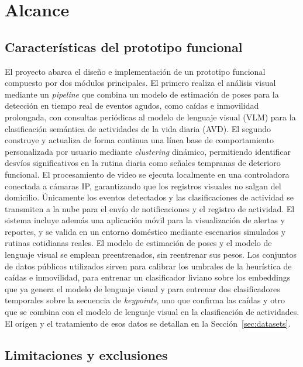 \section{Alcance}

\subsection{Características del prototipo funcional}

El proyecto abarca el diseño e implementación de un prototipo funcional compuesto por dos módulos principales.
El primero realiza el análisis visual mediante un \textit{pipeline} que combina un modelo de estimación de poses para la detección en tiempo real de eventos agudos, como caídas e inmovilidad prolongada, con consultas periódicas al modelo de lenguaje visual (VLM) para la clasificación semántica de actividades de la vida diaria (AVD).
El segundo construye y actualiza de forma continua una línea base de comportamiento personalizada por usuario mediante \textit{clustering} dinámico, permitiendo identificar desvíos significativos en la rutina diaria como señales tempranas de deterioro funcional.
El procesamiento de video se ejecuta localmente en una controladora conectada a cámaras IP, garantizando que los registros visuales no salgan del domicilio.
Únicamente los eventos detectados y las clasificaciones de actividad se transmiten a la nube para el envío de notificaciones y el registro de actividad.
El sistema incluye además una aplicación móvil para la visualización de alertas y reportes, y se valida en un entorno doméstico mediante escenarios simulados y rutinas cotidianas reales.
El modelo de estimación de poses y el modelo de lenguaje visual se emplean preentrenados, sin reentrenar sus pesos.
Los conjuntos de datos públicos utilizados sirven para calibrar los umbrales de la heurística de caídas e inmovilidad, para entrenar un clasificador liviano sobre los embeddings que ya genera el modelo de lenguaje visual y para entrenar dos clasificadores temporales sobre la secuencia de \textit{keypoints}, uno que confirma las caídas y otro que se combina con el modelo de lenguaje visual en la clasificación de actividades.
El origen y el tratamiento de esos datos se detallan en la Sección~\ref{sec:datasets}.

\subsection{Limitaciones y exclusiones}
\label{sec:limitaciones-exclusiones}

